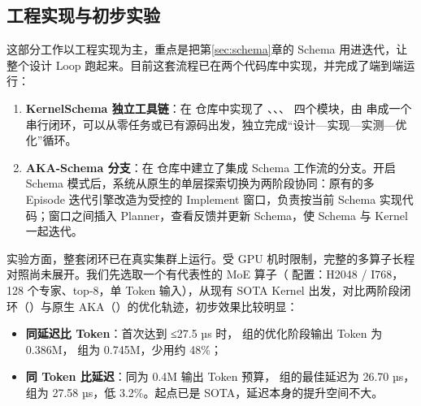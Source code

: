 \newpage


\subsection{工程实现与初步实验}\label{sec:planner-coder-progress}
这部分工作以工程实现为主，重点是把第\ref{sec:schema}章的 Schema 用进迭代，让整个设计 Loop 跑起来。目前这套流程已在两个代码库中实现，并完成了端到端运行：


\begin{enumerate}[start=1]
\item
\textbf{KernelSchema 独立工具链}：在  仓库中实现了 、、、 四个模块，由  串成一个串行闭环，可以从零任务或已有源码出发，独立完成“设计—实现—实测—优化”循环。


\item
\textbf{AKA-Schema 分支}：在  仓库中建立了集成 Schema 工作流的分支。开启 Schema 模式后，系统从原生的单层探索切换为两阶段协同：原有的多 Episode 迭代引擎改造为受控的 Implement 窗口，负责按当前 Schema 实现代码；窗口之间插入 Planner，查看反馈并更新 Schema，使 Schema 与 Kernel 一起迭代。


\end{enumerate}

实验方面，整套闭环已在真实集群上运行。受 GPU 机时限制，完整的多算子长程对照尚未展开。我们先选取一个有代表性的 MoE 算子（ 配置：H2048 / I768，128 个专家、top-8，单 Token 输入），从现有 SOTA Kernel 出发，对比两阶段闭环（）与原生 AKA（）的优化轨迹，初步效果比较明显：


\begin{itemize}
\item
\textbf{同延迟比 Token}：首次达到 ≤27.5 µs 时， 组的优化阶段输出 Token 为 0.386M， 组为 0.745M，少用约 48\%；


\item
\textbf{同 Token 比延迟}：同为 0.4M 输出 Token 预算， 组的最佳延迟为 26.70 µs， 组为 27.58 µs，低 3.2\%。起点已是 SOTA，延迟本身的提升空间不大。


\end{itemize}




